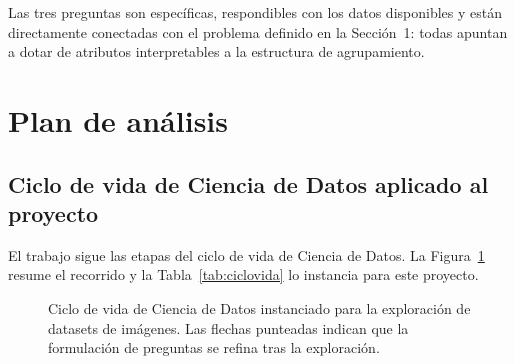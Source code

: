 \documentclass[11pt,a4paper]{article}
\begin{document}
Las tres preguntas son específicas, respondibles con los datos disponibles y
están directamente conectadas con el problema definido en la Sección~1: todas
apuntan a dotar de atributos interpretables a la estructura de agrupamiento.

\section{Plan de análisis}

\subsection{Ciclo de vida de Ciencia de Datos aplicado al proyecto}

El trabajo sigue las etapas del ciclo de vida de Ciencia de Datos. La
Figura~\ref{fig:ciclovida} resume el recorrido y la Tabla~\ref{tab:ciclovida} lo
instancia para este proyecto.

\begin{figure}[H]
\centering
{}
\caption{Ciclo de vida de Ciencia de Datos instanciado para la exploración de
datasets de imágenes. Las flechas punteadas indican que la formulación de
preguntas se refina tras la exploración.}
\label{fig:ciclovida}
\end{figure}
\end{document}
